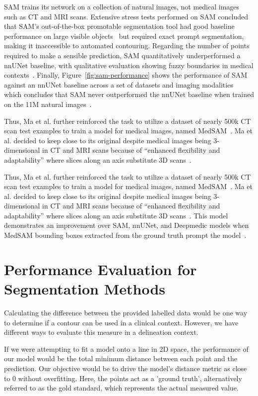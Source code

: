 \documentclass[12pt,twoside]{report}
\begin{document}
SAM trains its network on a collection of natural images, not medical images such as CT and MRI scans. Extensive stress tests performed on SAM concluded that SAM's out-of-the-box promotable segmentation tool had good baseline performance on large visible objects~\cite{deng2023segment} but required exact prompt segmentation, making it inaccessible to automated contouring. Regarding the number of points required to make a sensible prediction, SAM quantitatively underperformed a nnUNet baseline, with qualitative evaluation showing fuzzy boundaries in medical contexts~\cite{hu2023sam}. Finally, Figure~\ref{fig:sam-performance} shows the performance of SAM against an nnUNet baseline across a set of datasets and imaging modalities~\cite{he2023computervision} which concludes that SAM never outperformed the nnUNet baseline when trained on the 11M natural images~\cite{SAM}. 

Thus, Ma et al. further reinforced the task to utilize a dataset of nearly 500k CT scan test examples to train a model for medical images, named MedSAM~\cite{Ma2024}. Ma et al. decided to keep close to its original despite medical images being 3-dimensional in CT and MRI scans because of ``enhanced flexibility and adaptability'' where slices along an axis substitute 3D scans~\cite{Ma2024}.

Thus, Ma et al. further reinforced the task to utilize a dataset of nearly 500k CT scan test examples to train a model for medical images, named MedSAM~\cite{Ma2024}. Ma et al. decided to keep close to its original despite medical images being 3-dimensional in CT and MRI scans because of ``enhanced flexibility and adaptability'' where slices along an axis substitute 3D scans~\cite{Ma2024}. This model demonstrates an improvement over SAM, nnUNet, and Deepmedic models when MedSAM bounding boxes extracted from the ground truth prompt the model~\cite{Ma2024}.

\clearpage

\section{Performance Evaluation for Segmentation Methods}\label{sect:performance-evaluation}

Calculating the difference between the provided labelled data would be one way to determine if a contour can be used in a clinical context. However, we have different ways to evaluate this measure in a delineation context.

If we were attempting to fit a model onto a line in 2D space, the performance of our model would be the total minimum distance between each point and the prediction. Our objective would be to drive the model's distance metric as close to 0 without overfitting. Here, the points act as a 'ground truth', alternatively referred to as the gold standard, which represents the actual measured value.
\end{document}
